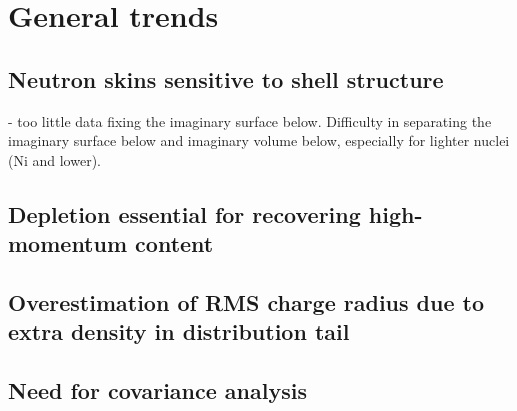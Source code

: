 \section{General trends}
\subsection{Neutron skins sensitive to shell structure}
- too little data fixing the imaginary surface below. Difficulty in separating the imaginary surface
below and imaginary volume below, especially for lighter nuclei (Ni and lower).
\subsection{Depletion essential for recovering high-momentum content}
\subsection{Overestimation of RMS charge radius due to extra density in distribution tail}
\subsection{Need for covariance analysis}

\afterpage{\clearpage}
